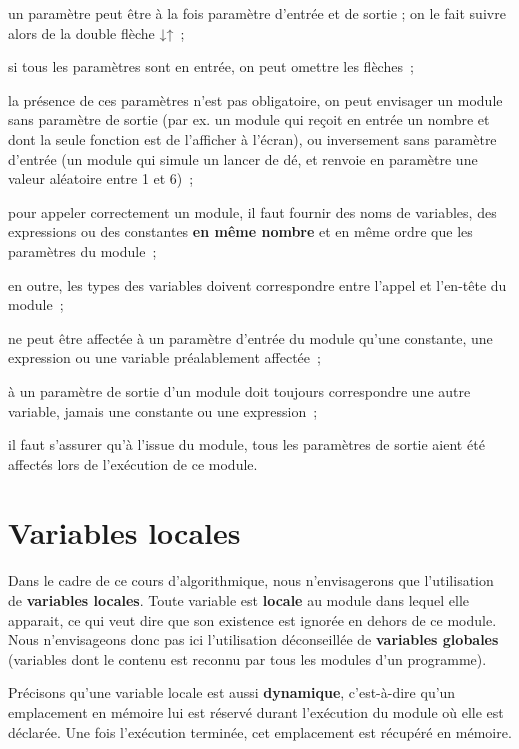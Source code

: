 	\begin{liste}
	\item {
	{un paramètre peut être à la fois paramètre
	d’entrée et de sortie ; on le fait suivre alors de la double flèche
	}{↓↑}{~;}}
	\item {
	si tous les paramètres sont en entrée, on peut omettre les flèches~;}
	\item {
	la présence de ces paramètres n’est pas obligatoire, on peut envisager
	un module sans paramètre de sortie (par ex. un module qui reçoit en
	entrée un nombre et dont la seule fonction est de l’afficher à
	l’écran), ou inversement sans paramètre d’entrée (un module qui simule
	un lancer de dé, et renvoie en paramètre une valeur aléatoire entre 1
	et 6)~;}
	\item {
	{pour appeler correctement un module, il faut
	fournir des noms de variables, des expressions ou des constantes
	}{\textbf{en même
	nombre}}{ et en même ordre que les paramètres
	du module~;}}
	\item {
	en outre, les types des variables doivent correspondre entre l’appel et
	l’en-tête du module~;}
	\item {
	ne peut être affectée à un paramètre d’entrée du module qu’une
	constante, une expression ou une variable préalablement affectée~;}
	\item {
	à un paramètre de sortie d’un module doit toujours correspondre une
	autre variable, jamais une constante ou une expression~;}
	\item {
	il faut s’assurer qu’à l’issue du module, tous les paramètres de sortie
	aient été affectés lors de l’exécution de ce module.}
	\end{liste}

\section{Variables locales}

	Dans le cadre de ce cours d’algorithmique,
	nous n’envisagerons que l’utilisation de 
	\textbf{variables locales}. 
	Toute variable est \textbf{locale} au module 
	dans lequel elle apparait, ce qui veut dire que son existence
	est ignorée en dehors de ce module. 
	Nous n’envisageons donc pas ici l’utilisation déconseillée de 
	\textbf{variables globales} 
	(variables dont le contenu est reconnu 
	par tous les modules d’un programme).

	Précisons qu’une variable locale est aussi
	\textbf{dynamique}, c’est-à-dire qu’un emplacement en mémoire lui est
	réservé durant l’exécution du module où elle est déclarée. Une fois
	l’exécution terminée, cet emplacement est récupéré en mémoire.

